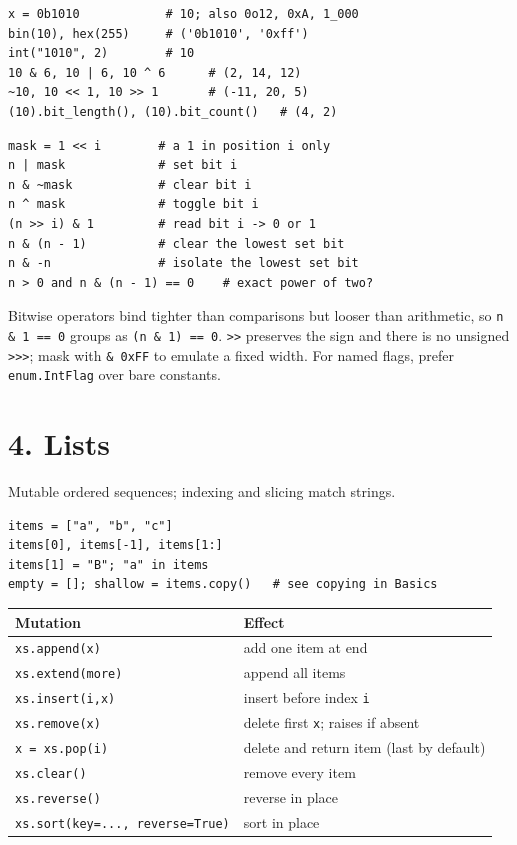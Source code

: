 \documentclass[10pt,a4paper]{article}
\newcommand{\py}[1]{\texttt{#1}}
\newenvironment{tbl}{\par\begin{lrbox}{\tblbox}\begin{minipage}{\linewidth}\compacttable}%
  {\end{minipage}\end{lrbox}\noindent\raisebox{\dp\tblbox}{\usebox{\tblbox}}\par}
\newcommand{\compacttable}{\fontsize{10}{11.2}\selectfont\setlength{\tabcolsep}{2.5pt}\renewcommand{\arraystretch}{1.08}}
\begin{document}
\begin{multicols}{2}
\begin{lstlisting}
x = 0b1010            # 10; also 0o12, 0xA, 1_000
bin(10), hex(255)     # ('0b1010', '0xff')
int("1010", 2)        # 10
10 & 6, 10 | 6, 10 ^ 6      # (2, 14, 12)
~10, 10 << 1, 10 >> 1       # (-11, 20, 5)
(10).bit_length(), (10).bit_count()   # (4, 2)
\end{lstlisting}

\begin{lstlisting}
mask = 1 << i        # a 1 in position i only
n | mask             # set bit i
n & ~mask            # clear bit i
n ^ mask             # toggle bit i
(n >> i) & 1         # read bit i -> 0 or 1
n & (n - 1)          # clear the lowest set bit
n & -n               # isolate the lowest set bit
n > 0 and n & (n - 1) == 0    # exact power of two?
\end{lstlisting}

Bitwise operators bind tighter than comparisons but looser than arithmetic, so \py{n \& 1 == 0} groups as \py{(n \& 1) == 0}. \py{>{}>} preserves the sign and there is no unsigned \py{>{}>{}>}; mask with \py{\& 0xFF} to emulate a fixed width. For named flags, prefer \py{enum.IntFlag} over bare constants.

\section{4. Lists}

Mutable ordered sequences; indexing and slicing match strings.

\begin{lstlisting}
items = ["a", "b", "c"]
items[0], items[-1], items[1:]
items[1] = "B"; "a" in items
empty = []; shallow = items.copy()   # see copying in Basics
\end{lstlisting}

\begin{tbl}
\begin{tabularx}{\linewidth}{@{}R{.47\linewidth}L@{}}
\toprule
\textbf{Mutation} & \textbf{Effect} \\
\midrule
\py{xs.append(x)} & add one item at end \\
\py{xs.extend(more)} & append all items \\
\py{xs.insert(i,x)} & insert before index \py{i} \\
\py{xs.remove(x)} & delete first \py{x}; raises if absent \\
\py{x = xs.pop(i)} & delete and return item (last by default) \\
\py{xs.clear()} & remove every item \\
\py{xs.reverse()} & reverse in place \\
\py{xs.sort(key=..., reverse=True)} & sort in place \\
\bottomrule
\end{tabularx}
\end{tbl}


\end{multicols}
\end{document}
